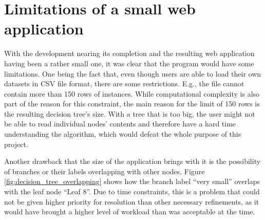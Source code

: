 \section{Limitations of a small web application}
With the development nearing its completion and the resulting web application having been a rather small one, it was clear that the program would have some limitations. One being the fact that, even though users are able to load their own datasets in CSV file format, there are some restrictions. E.g., the file cannot contain more than 150 rows of instances. While computational complexity is also part of the reason for this constraint, the main reason for the limit of 150 rows is the resulting decision tree's size. With a tree that is too big, the user might not be able to read individual nodes' contents and therefore have a hard time understanding the algorithm, which would defeat the whole purpose of this project.

Another drawback that the size of the application brings with it is the possibility of branches or their labels overlapping with other nodes. Figure \ref{fig:decision_tree_overlapping} shows how the branch label ``very small'' overlaps with the leaf node ``Leaf 8''.
Due to time constraints, this is a problem that could not be given higher priority for resolution than other necessary refinements, as it would have brought a higher level of workload than was acceptable at the time.